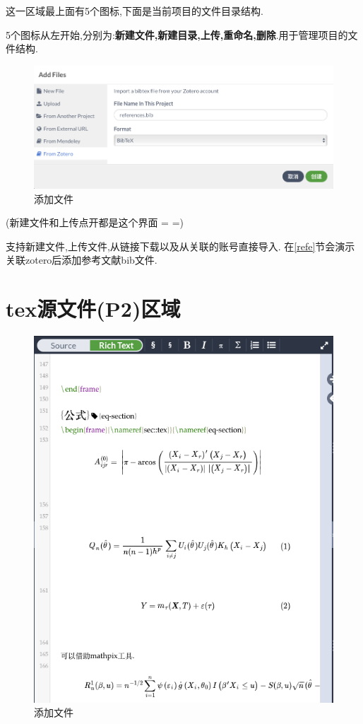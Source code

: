 \documentclass[]{ctexbook}
\begin{document}
这一区域最上面有5个图标,下面是当前项目的文件目录结构.

5个图标从左开始,分别为:\textbf{新建文件,新建目录,上传,重命名,删除}.用于管理项目的文件结构.

\begin{figure}
\centering
\includegraphics{figure/addfiles.png}
\caption{添加文件}
\end{figure}

(新建文件和上传点开都是这个界面 = =)

支持新建文件,上传文件,从链接下载以及从关联的账号直接导入.
在\ref{refe}节会演示关联zotero后添加参考文献bib文件.

\hypertarget{texp2}{%
\section{tex源文件(P2)区域}\label{texp2}}

\begin{figure}
\centering
\includegraphics{figure/P2.png}
\caption{添加文件}
\end{figure}
\end{document}
